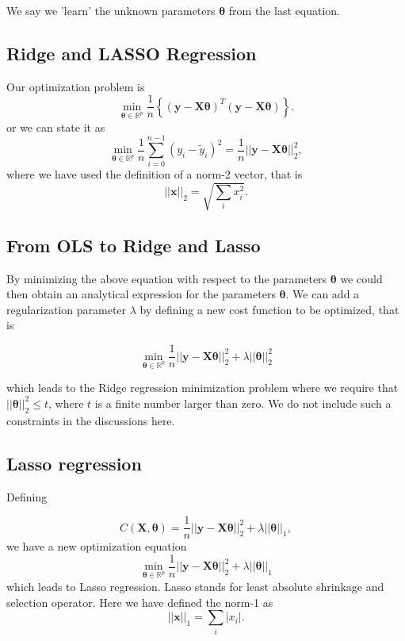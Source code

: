 \documentclass[%
oneside,                 %
final,                   %
10pt]{article}
\begin{document}
We say we 'learn' the unknown parameters $\bm{\theta}$ from the last equation.

\subsection{Ridge and LASSO Regression}

Our optimization problem is
\[
{\displaystyle \min_{\bm{\theta}\in {\mathbb{R}}^{p}}}\frac{1}{n}\left\{\left(\bm{y}-\bm{X}\bm{\theta}\right)^T\left(\bm{y}-\bm{X}\bm{\theta}\right)\right\}.
\]
or we can state it as
\[
{\displaystyle \min_{\bm{\theta}\in
{\mathbb{R}}^{p}}}\frac{1}{n}\sum_{i=0}^{n-1}\left(y_i-\tilde{y}_i\right)^2=\frac{1}{n}\vert\vert \bm{y}-\bm{X}\bm{\theta}\vert\vert_2^2,
\]
where we have used the definition of  a norm-2 vector, that is
\[
\vert\vert \bm{x}\vert\vert_2 = \sqrt{\sum_i x_i^2}. 
\]

\subsection{From OLS to Ridge and Lasso}

By minimizing the above equation with respect to the parameters
$\bm{\theta}$ we could then obtain an analytical expression for the
parameters $\bm{\theta}$.  We can add a regularization parameter $\lambda$ by
defining a new cost function to be optimized, that is

\[
{\displaystyle \min_{\bm{\theta}\in
{\mathbb{R}}^{p}}}\frac{1}{n}\vert\vert \bm{y}-\bm{X}\bm{\theta}\vert\vert_2^2+\lambda\vert\vert \bm{\theta}\vert\vert_2^2
\]

which leads to the Ridge regression minimization problem where we
require that $\vert\vert \bm{\theta}\vert\vert_2^2\le t$, where $t$ is
a finite number larger than zero. We do not include such a constraints in the discussions here.

\subsection{Lasso regression}

Defining

\[
C(\bm{X},\bm{\theta})=\frac{1}{n}\vert\vert \bm{y}-\bm{X}\bm{\theta}\vert\vert_2^2+\lambda\vert\vert \bm{\theta}\vert\vert_1,
\]
we have a new optimization equation
\[
{\displaystyle \min_{\bm{\theta}\in
{\mathbb{R}}^{p}}}\frac{1}{n}\vert\vert \bm{y}-\bm{X}\bm{\theta}\vert\vert_2^2+\lambda\vert\vert \bm{\theta}\vert\vert_1
\]
which leads to Lasso regression. Lasso stands for least absolute shrinkage and selection operator. 
Here we have defined the norm-1 as 
\[
\vert\vert \bm{x}\vert\vert_1 = \sum_i \vert x_i\vert. 
\]
\end{document}

